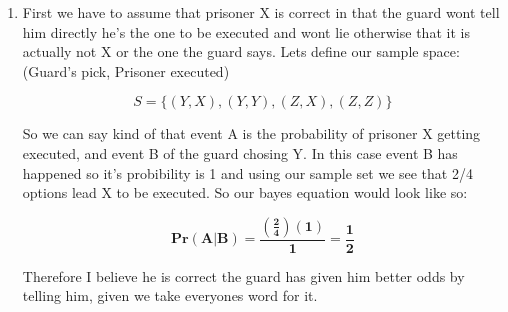 \documentclass{article}
\begin{document}
\begin{enumerate}
    \item First we have to assume that prisoner X is correct in that the guard wont tell him directly he's the one to be executed and wont lie otherwise that it is actually not X or the one the guard says. Lets define our sample space: \\
    
    (Guard's pick, Prisoner executed)
    
    \[S = \{(Y,X),(Y,Y),(Z,X),(Z,Z)\}\]

    So we can say kind of that event A is the probability of prisoner X getting executed, and event B of the guard chosing Y. In this case event B has happened so it's probibility is 1 and using our sample set we see that 2/4 options lead X to be executed. So our bayes equation would look like so:
    
    \[\bm{Pr(A|B) = \frac{(\frac{2}{4})(1)}{1} = \frac{1}{2}}\]

    Therefore I believe he is correct the guard has given him better odds by telling him, given we take everyones word for it.



  \end{enumerate}
\end{document}
